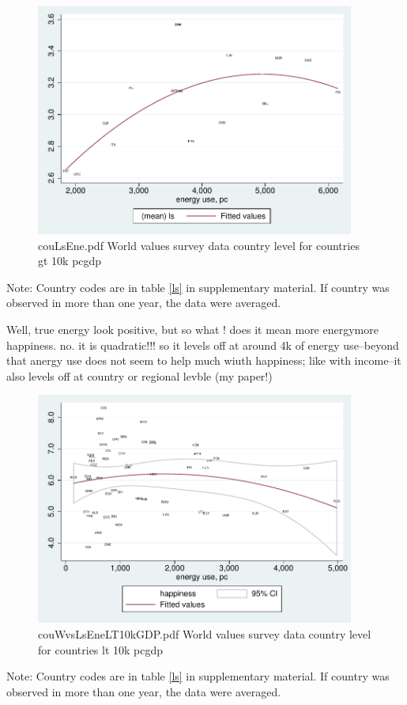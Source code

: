 \documentclass[10pt, letterpaper]{article}
\begin{document}
\begin{spacing}{1.4}
\begin{figure}[H]
 \includegraphics[height=3in]{graphsAndTables/couLsEne.pdf}\centering
\caption{couLsEne.pdf World values survey data country level for countries gt 10k pcgdp}\label{couLsEne.pdf}
\end{figure}
{\scriptsize Note: Country codes are in table \ref{ls} in supplementary
  material. If country was observed in more than one year, the data were averaged.}

Well, true energy look positive, but so what ! does it mean more energymore
happiness. no. it is quadratic!!! so it levels off at around 4k of energy
use--beyond that anergy use does not seem to help much wiuth happiness; like
with income--it also levels off at country or regional levble (my paper!)

\begin{figure}[H]
 \includegraphics[height=3in]{graphsAndTables/couWvsLsEneLT10kGDP.pdf}\centering
\caption{couWvsLsEneLT10kGDP.pdf World values survey data country level for countries lt 10k pcgdp}\label{couWvsLsEneLT10kGDP.pdf}
\end{figure}
{\scriptsize Note: Country codes are in table \ref{ls} in supplementary
  material. If country was observed in more than one year, the data were averaged.}


\end{spacing}
\end{document}
